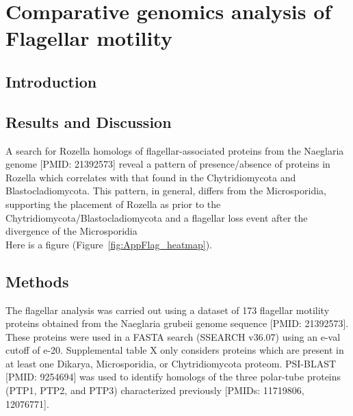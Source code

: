 \chapter{Comparative genomics analysis of Flagellar motility}
\label{app:Flagella}
\section{Introduction}
\section{Results and Discussion}
A search for Rozella homologs of flagellar-associated proteins from the Naeglaria genome [PMID: 21392573] reveal a pattern of presence/absence of proteins in Rozella which correlates with that found in the Chytridiomycota and Blastocladiomycota. This pattern, in general, differs from the Microsporidia, supporting the placement of Rozella as prior to the Chytridiomycota/Blastocladiomycota and a flagellar loss event after the divergence of the Microsporidia \\
\indent Here is a figure (Figure~\ref{fig:AppFlag_heatmap}).\\
\section{Methods}
The flagellar analysis was carried out using a dataset of 173 flagellar motility proteins obtained from the Naeglaria grubeii genome sequence [PMID: 21392573]. These proteins were used in a FASTA search (SSEARCH v36.07) using an e-val cutoff of e-20. Supplemental table X only considers proteins which are present in at least one Dikarya, Microsporidia, or Chytridiomycota proteom. PSI-BLAST [PMID: 9254694] was used to identify homologs of the three polar-tube proteins (PTP1, PTP2, and PTP3) characterized previously [PMIDs: 11719806, 12076771].\\
